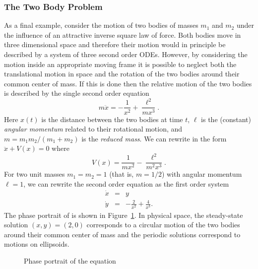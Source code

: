\documentclass{ximera}
\begin{document}
\subsubsection*{The Two Body Problem}

As a final example, consider the motion of two bodies of masses $m_1$ and 
$m_2$ under the influence of an attractive inverse square law of force.  Both 
bodies move in three dimensional space and therefore their motion would in 
principle be described by a system of three second order ODEs. However, by 
considering the motion inside an appropriate moving frame it is possible to 
neglect both the translational motion in space and the rotation of the two 
bodies around their common center of mass.  If this is done then the relative 
motion of the two bodies is described by the single second order equation
\begin{equation} \label{E:2body}
m\ddot x = -\frac{1}{x^2} + \frac{\ell^2}{mx^3}.
\end{equation}
Here $x(t)$ is the distance between the two bodies at time $t$,  $\ell$ is 
the (constant) {\em angular momentum\/} related to their rotational motion, 
and $m=m_1 m_2/(m_1 + m_2)$ is the {\em reduced mass}. 
We can rewrite  in the form $\ddot{x}+V(x)=0$ where
\[
V(x) =  \frac{1}{mx^2} - \frac{\ell^2}{m^2x^3}.
\]
For two unit masses $m_1=m_2=1$ (that is, $m=1/2$) with angular momentum 
$\ell = 1$, we can rewrite the second order equation as the first order system 
\begin{equation*} \label{e:tbp}
\begin{array}{rcl}
\dot{x} & = & y \\
\dot{y} & = & -\frac{2}{x^2} + \frac{4}{x^3}.
\end{array}
\end{equation*}
The phase portrait of  is shown in Figure~\ref{fig:tbp}.  In 
physical space, the steady-state solution $(x,y)=(2,0)$ corresponds to a 
circular motion of the two bodies around their common center of mass and 
the periodic solutions correspond to motions on ellipsoids.

\begin{figure}[htb]
           \centerline{%
           }
           \caption{Phase portrait of the equation
                \protect{}}
           \label{fig:tbp}
\end{figure}



\EXER
\end{document}
